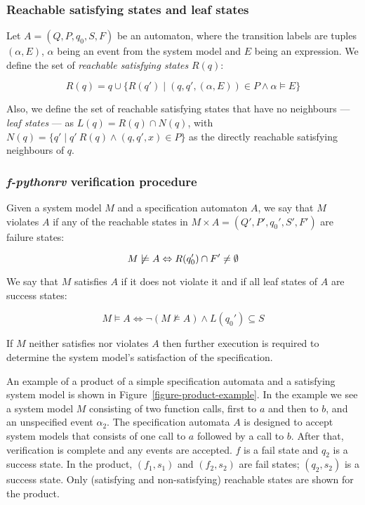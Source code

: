 \subsubsection{Reachable satisfying states and leaf states}

Let $A = (Q,P,q_0,S,F)$ be an automaton, where the transition labels are tuples
$(\alpha, E)$, $\alpha$ being an event from the system model and $E$ being an
expression. We define the set of \textit{reachable satisfying states} $R(q)$:

\medskip
\[
  R(q) = q \cup \{R(q') \; | \; (q,q',(\alpha,E)) \in P \wedge \alpha \models E\}
\]
\medskip

Also, we define the set of reachable satisfying states that have no neighbours
--- \textit{leaf states} --- as $L(q) = R(q) \cap N(q)$, with $N(q) = \{q' \; |
\; q' \ R(q) \wedge (q,q',x) \in P\}$ as the directly reachable satisfying
neighbours of $q$.


\subsubsection{\textit{f-pythonrv} verification procedure}

Given a system model $M$ and a specification automaton $A$, we say that $M$
violates $A$ if any of the reachable states in $M \times A = (Q', P', q_0', S',
F')$ are failure states:

\medskip
\[
  M \not\models A \Leftrightarrow R(q_0') \cap F' \neq \emptyset \\
\]
\medskip

We say that $M$ satisfies $A$ if it does not violate it and if all leaf states
of $A$ are success states:

\medskip
\[
  M \models A \Leftrightarrow \neg(M \not\models A) \wedge L(q_0') \subseteq S
\]
\medskip

If $M$ neither satisfies nor violates $A$ then further execution is required to
determine the system model's satisfaction of the specification.

An example of a product of a simple specification automata and a satisfying
system model is shown in Figure~\ref{figure-product-example}. In the example we
see a system model $M$ consisting of two function calls, first to $a$ and then
to $b$, and an unspecified event $\alpha_2$. The specification automata $A$ is
designed to accept system models that consists of one call to $a$ followed by a
call to $b$. After that, verification is complete and any events are accepted.
$f$ is a fail state and $q_2$ is a success state. In the product, $(f_1,s_1)$
and $(f_2,s_2)$ are fail states; $(q_2,s_2)$ is a success state. Only
(satisfying and non-satisfying) reachable states are shown for the product.


